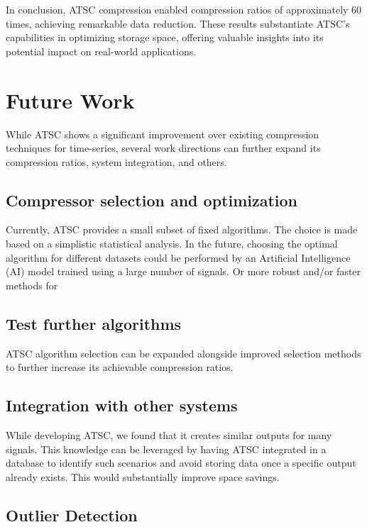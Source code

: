 \documentclass[conference]{IEEEtran}
\begin{document}
In conclusion, ATSC compression enabled compression ratios of approximately 60 times, achieving remarkable data reduction. 
These results substantiate ATSC's capabilities in optimizing storage space, offering valuable insights into its potential impact on real-world applications. 

\section{Future Work}

While ATSC shows a significant improvement over existing compression techniques for time-series,  several work directions can further expand its compression ratios, system integration, and others. 

\subsection{Compressor selection and optimization}

Currently, ATSC provides a small subset of fixed algorithms. The choice is made based on a simplistic statistical analysis. In the future, choosing the optimal algorithm for different datasets could be performed by an Artificial Intelligence (AI) model trained using a large number of signals. 
Or more robust and/or faster methods for 

\subsection*{Test further algorithms}

ATSC algorithm selection can be expanded alongside improved selection methods to further increase its achievable compression ratios.

\subsection{Integration with other systems}

While developing ATSC, we found that it creates similar outputs for many signals. This knowledge can be leveraged by having ATSC integrated in a database to identify such scenarios and avoid storing data once a specific output already exists. This would substantially improve space savings.

\subsection{Outlier Detection}
\end{document}
